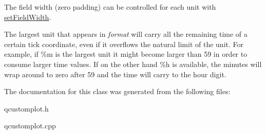The field width (zero padding) can be controlled for each unit with \hyperlink{classQCPAxisTickerTime_adc13e54fc969be98a5c0e3fa0dbaa293}{set\+Field\+Width}.

The largest unit that appears in {\itshape format} will carry all the remaining time of a certain tick coordinate, even if it overflows the natural limit of the unit. For example, if \%m is the largest unit it might become larger than 59 in order to consume larger time values. If on the other hand \%h is available, the minutes will wrap around to zero after 59 and the time will carry to the hour digit. 

The documentation for this class was generated from the following files\+:\begin{DoxyCompactItemize}
\item 
qcustomplot.\+h\item 
qcustomplot.\+cpp\end{DoxyCompactItemize}
